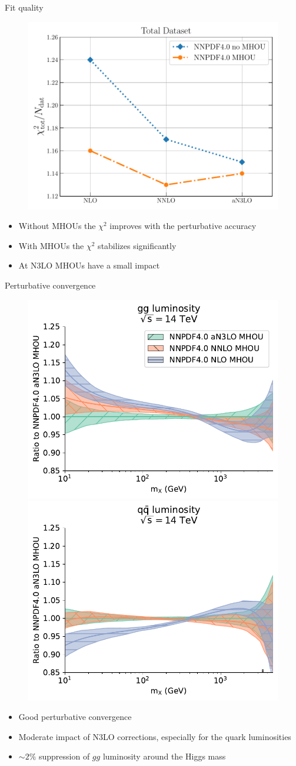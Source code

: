 \documentclass[aspectratio=169, 9pt,t]{beamer}
\begin{document}
\begin{frame}{Fit quality}
  \begin{figure}[!t]
    \includegraphics[width=.4\textwidth]{figures/chi2_n3lo_summary.pdf}
  \end{figure}
  \begin{itemize}
    \item Without MHOUs the $\chi^2$ improves with the perturbative accuracy
    \item With MHOUs the $\chi^2$ stabilizes significantly
    \item At N3LO MHOUs have a small impact
  \end{itemize}
\end{frame}

\begin{frame}{Perturbative convergence}
  \begin{figure}[!t]
    \includegraphics[width=.4\textwidth]{figures/gg_plot_lumi1d_convergence.pdf}
    \includegraphics[width=.4\textwidth]{figures/qqbar_plot_lumi1d_convergence.pdf}
  \end{figure}
  \begin{itemize}
    \item Good perturbative convergence
    \item Moderate impact of N3LO corrections, especially for the quark luminosities
    \item $\sim2\%$ suppression of $gg$ luminosity around the Higgs mass
  \end{itemize}
\end{frame}
\end{document}

